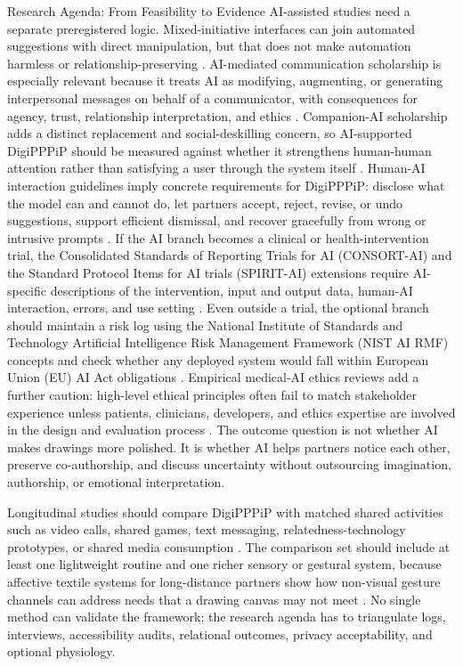 \documentclass[
  ignorenonframetext,
]{beamer}
\begin{document}
\begin{frame}{Research Agenda: From
Feasibility to Evidence}
AI-assisted studies need a separate preregistered logic.
Mixed-initiative interfaces can join automated suggestions with direct
manipulation, but that does not make automation harmless or
relationship-preserving . AI-mediated communication scholarship
is especially relevant because it treats AI as modifying, augmenting, or
generating interpersonal messages on behalf of a communicator, with
consequences for agency, trust, relationship interpretation, and ethics
. Companion-AI scholarship adds
a distinct replacement and social-deskilling concern, so AI-supported
DigiPPPiP should be measured against whether it strengthens human-human
attention rather than satisfying a user through the system itself
. Human-AI interaction guidelines imply
concrete requirements for DigiPPPiP: disclose what the model can and
cannot do, let partners accept, reject, revise, or undo suggestions,
support efficient dismissal, and recover gracefully from wrong or
intrusive prompts . If the AI branch becomes a
clinical or health-intervention trial, the Consolidated Standards of
Reporting Trials for AI (CONSORT-AI) and the Standard Protocol Items for
AI trials (SPIRIT-AI) extensions require AI-specific descriptions of the
intervention, input and output data, human-AI interaction, errors, and
use setting . Even
outside a trial, the optional branch should maintain a risk log using
the National Institute of Standards and Technology Artificial
Intelligence Risk Management Framework (NIST AI RMF) concepts and check
whether any deployed system would fall within European Union (EU) AI Act
obligations . Empirical
medical-AI ethics reviews add a further caution: high-level ethical
principles often fail to match stakeholder experience unless patients,
clinicians, developers, and ethics expertise are involved in the design
and evaluation process . The outcome
question is not whether AI makes drawings more polished. It is whether
AI helps partners notice each other, preserve co-authorship, and discuss
uncertainty without outsourcing imagination, authorship, or emotional
interpretation.

Longitudinal studies should compare DigiPPPiP with matched shared
activities such as video calls, shared games, text messaging,
relatedness-technology prototypes, or shared media consumption
. The comparison set should include at
least one lightweight routine and one richer sensory or gestural system,
because affective textile systems for long-distance partners show how
non-visual gesture channels can address needs that a drawing canvas may
not meet . No single method can validate the
framework; the research agenda has to triangulate logs, interviews,
accessibility audits, relational outcomes, privacy acceptability, and
optional physiology.
\end{frame}
\end{document}
